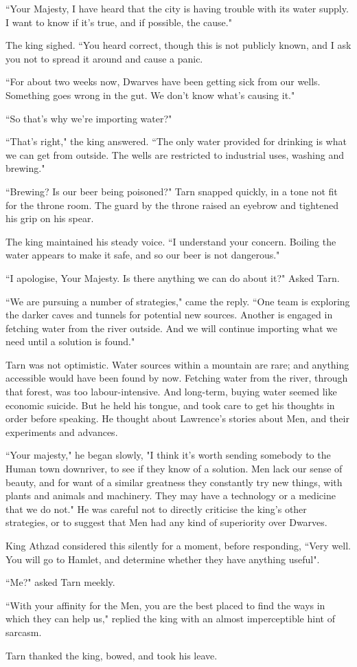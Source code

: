 ``Your Majesty, I have heard that the city is having trouble with its water supply.  I want to know if it's true, and if possible, the cause."

The king sighed.  ``You heard correct, though this is not publicly known, and I ask you not to spread it around and cause a panic.

``For about two weeks now, Dwarves have been getting sick from our wells.  Something goes wrong in the gut.  We don't know what's causing it."

``So that's why we're importing water?"

``That's right," the king answered.  ``The only water provided for drinking is what we can get from outside.  The wells are restricted to industrial uses, washing and brewing."

``Brewing?  Is our beer being poisoned?" Tarn snapped quickly, in a tone not fit for the throne room.  The guard by the throne raised an eyebrow and tightened his grip on his spear.

The king maintained his steady voice.  ``I understand your concern.  Boiling the water appears to make it safe, and so our beer is not dangerous."

``I apologise, Your Majesty.  Is there anything we can do about it?"  Asked Tarn.

``We are pursuing a number of strategies," came the reply.  ``One team is exploring the darker caves and tunnels for potential new sources.  Another is engaged in fetching water from the river outside.  And we will continue importing what we need until a solution is found."

Tarn was not optimistic.  Water sources within a mountain are rare; and anything accessible would have been found by now.  Fetching water from the river, through that forest, was too labour-intensive.  And long-term, buying water seemed like economic suicide.  But he held his tongue, and took care to get his thoughts in order before speaking.  He thought about Lawrence's stories about Men, and their experiments and advances.

``Your majesty," he began slowly, "I think it's worth sending somebody to the Human town downriver, to see if they know of a solution.  Men lack our sense of beauty, and for want of a similar greatness they constantly try new things, with plants and animals and machinery.  They may have a technology or a medicine that we do not."  He was careful not to directly criticise the king's other strategies, or to suggest that Men had any kind of superiority over Dwarves.

King Athzad considered this silently for a moment, before responding, ``Very well.  You will go to Hamlet, and determine whether they have anything useful".

``Me?" asked Tarn meekly.

``With your affinity for the Men, you are the best placed to find the ways in which they can help us," replied the king with an almost imperceptible hint of sarcasm.

Tarn thanked the king, bowed, and took his leave.